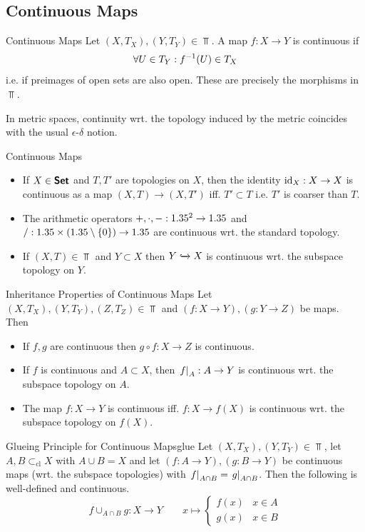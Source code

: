 \subsection{Continuous Maps}

\begin{definition}{Continuous Maps}{}
    Let $(X,T_X),(Y,T_Y)\in\Top$. A map $f:X\to Y$ is continuous if \[
    \forall U\in T_Y:f^{-1}(U)\in T_X
    \]
    i.e. if preimages of open sets are also open. These are precisely the morphisms in $\Top$.
\end{definition}

In metric spaces, continuity wrt. the topology induced by the metric coincides with the usual $\epsilon$-$\delta$ notion.

\begin{example}{Continuous Maps}{}
    \begin{itemize}
        \item If $X\in\bm{\mathsf{Set}}$ and $T,T'$ are topologies on $X$, then the identity $\operatorname{id}_X:X\to X$ is continuous as a map $(X,T)\to (X,T')$ iff. $T'\subset T$ i.e. $T'$ is coarser than $T$.
        \item The arithmetic operators $+,\cdot,-:1.35^2\to 1.35$ and $/:1.35\times (1.35\setminus\{0\})\to 1.35$ are continuous wrt. the standard topology.
        \item If $(X,T)\in\Top$ and $Y\subset X$ then $Y\xhookrightarrow{}X$ is continuous wrt. the subspace topology on $Y$. 
    \end{itemize}
\end{example}

\begin{theorem}{Inheritance Properties of Continuous Maps}{}
    Let $(X,T_X),(Y,T_Y),(Z,T_Z)\in\Top$ and $(f:X\to Y),(g:Y\to Z)$ be maps. Then \begin{itemize}
        \item If $f,g$ are continuous then $g\circ f:X\to Z$ is continuous.
        \item If $f$ is continuous and $A\subset X$, then $\mathopen{}\left.f\right|_{A}\mathclose{}:A\to Y$ is continuous wrt. the subspace topology on $A$.
        \item The map $f:X\to Y$ is continuous iff. $f:X\to f(X)$ is continuous wrt. the subspace topology on $f(X)$.
    \end{itemize}
\end{theorem}

\begin{theorem}{Glueing Principle for Continuous Maps}{glue}
    Let $(X,T_X),(Y,T_Y)\in\Top$, let $A,B\subset_{\text{cl}} X$ with $A\cup B=X$ and let $(f:A\to Y),(g:B\to Y)$ be continuous maps (wrt. the subspace topologies) with $\mathopen{}\left.f\right|_{A\cap B}\mathclose{}=\mathopen{}\left.g\right|_{A\cap B}\mathclose{}$. Then the following is well-defined and continuous. \[
    f\cup_{A\cap B}g:X\to Y \qquad x\mapsto \begin{cases}
        f(x) & x\in A\\g(x) & x\in B
    \end{cases}
    \]
\end{theorem}

